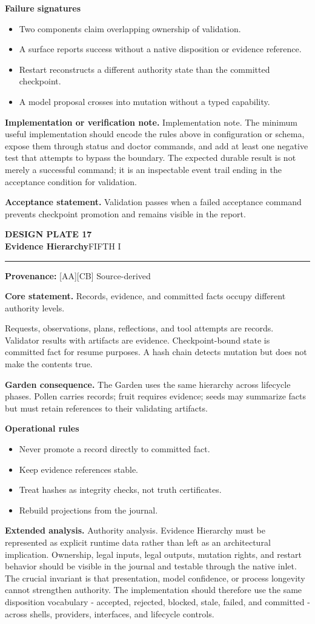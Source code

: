 \documentclass[10pt,letterpaper,oneside]{article}
\newcommand{\prov}[1]{\textcolor{gardenBlue}{\sffamily\footnotesize\textbf{Provenance:} #1}}
\newcommand{\platetitle}[3]{%
  \begin{minipage}[t][0.54in][t]{\textwidth}
  {\sffamily\bfseries\color{gardenDeep}\fontsize{9}{10}\selectfont DESIGN PLATE #1}\\[-1pt]
  {\sffamily\bfseries\color{gardenInk}\fontsize{16.5}{18}\selectfont #2}\hfill{\sffamily\color{gardenGreen}\large #3}
  \end{minipage}\vspace{-2pt}\hrule\vspace{5pt}}
\begin{document}
\textbf{Failure signatures}
\begin{itemize}
\item Two components claim overlapping ownership of validation.
\item A surface reports success without a native disposition or evidence reference.
\item Restart reconstructs a different authority state than the committed checkpoint.
\item A model proposal crosses into mutation without a typed capability.
\end{itemize}
\textbf{Implementation or verification note.} Implementation note. The minimum useful implementation should encode the rules above in configuration or schema, expose them through status and doctor commands, and add at least one negative test that attempts to bypass the boundary. The expected durable result is not merely a successful command; it is an inspectable event trail ending in the acceptance condition for validation.

\begin{acceptbox}
\textbf{Acceptance statement.} Validation passes when a failed acceptance command prevents checkpoint promotion and remains visible in the report.
\end{acceptbox}
\newpage
\platetitle{17}{Evidence Hierarchy}{FIFTH I}
\prov{[AA][CB] Source-derived}
\fontsize{8.85}{10.45}\selectfont
\begin{corebox}
\textbf{Core statement.} Records, evidence, and committed facts occupy different authority levels.
\end{corebox}
Requests, observations, plans, reflections, and tool attempts are records. Validator results with artifacts are evidence. Checkpoint-bound state is committed fact for resume purposes. A hash chain detects mutation but does not make the contents true.

\textbf{Garden consequence.} The Garden uses the same hierarchy across lifecycle phases. Pollen carries records; fruit requires evidence; seeds may summarize facts but must retain references to their validating artifacts.

\textbf{Operational rules}
\begin{itemize}
\item Never promote a record directly to committed fact.
\item Keep evidence references stable.
\item Treat hashes as integrity checks, not truth certificates.
\item Rebuild projections from the journal.
\end{itemize}
\textbf{Extended analysis.} Authority analysis. Evidence Hierarchy must be represented as explicit runtime data rather than left as an architectural implication. Ownership, legal inputs, legal outputs, mutation rights, and restart behavior should be visible in the journal and testable through the native inlet. The crucial invariant is that presentation, model confidence, or process longevity cannot strengthen authority. The implementation should therefore use the same disposition vocabulary - accepted, rejected, blocked, stale, failed, and committed - across shells, providers, interfaces, and lifecycle controls.
\end{document}
